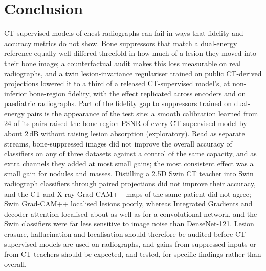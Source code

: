 \section{Conclusion}
\label{sec:conclusion}
CT-supervised models of chest radiographs can fail in ways that fidelity and accuracy metrics do not show. Bone suppressors that match a
dual-energy reference equally well differed threefold in how much of a lesion they moved into their bone image; a counterfactual audit makes
this loss measurable on real radiographs, and a twin lesion-invariance regulariser trained on public CT-derived projections lowered it to a
third of a released CT-supervised model's, at non-inferior bone-region fidelity, with the effect replicated across encoders and on
paediatric radiographs. Part of the fidelity gap to suppressors trained on dual-energy pairs is the appearance of the test site: a smooth
calibration learned from 24 of its pairs raised the bone-region PSNR of every CT-supervised model by about 2\,dB without raising lesion
absorption (exploratory). Read as separate streams, bone-suppressed images did not improve the overall accuracy of classifiers on any of three
datasets against a control of the same capacity, and as extra channels they added at most small gains; the most consistent effect was a
small gain for nodules and masses. Distilling a 2.5D Swin CT teacher into Swin
radiograph classifiers through paired projections did not improve their accuracy, and the CT and X-ray Grad-CAM++ maps of the same patient
did not agree; Swin Grad-CAM++ localised lesions poorly, whereas Integrated Gradients and decoder attention localised about as well as for a
convolutional network, and the Swin classifiers were far less sensitive to image noise than DenseNet-121. Lesion erasure, hallucination and localisation
should therefore be audited before CT-supervised models are used on radiographs, and gains from suppressed inputs or from CT teachers should
be expected, and tested, for specific findings rather than overall.
